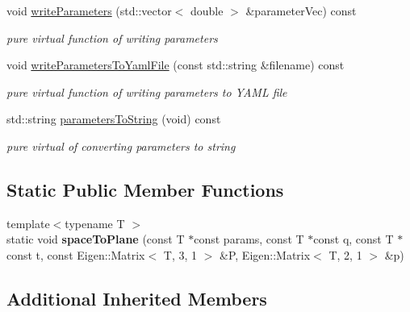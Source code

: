 \begin{DoxyCompactItemize}
void \hyperlink{classcamodocal_1_1PinholeCamera_a87f00320069f054a1dff89e23d65fa0b}{write\+Parameters} (std\+::vector$<$ double $>$ \&parameter\+Vec) const
\begin{DoxyCompactList}\small\item\em pure virtual function of writing parameters \end{DoxyCompactList}\item 
\mbox{\label{classcamodocal_1_1PinholeCamera_a364713cbd54cb444e0e853081c83a3ae}} 
void \hyperlink{classcamodocal_1_1PinholeCamera_a364713cbd54cb444e0e853081c83a3ae}{write\+Parameters\+To\+Yaml\+File} (const std\+::string \&filename) const
\begin{DoxyCompactList}\small\item\em pure virtual function of writing parameters to Y\+A\+ML file \end{DoxyCompactList}\item 
\mbox{\label{classcamodocal_1_1PinholeCamera_ab9381cdc2ec2d4248093d1ddf7d92dad}} 
std\+::string \hyperlink{classcamodocal_1_1PinholeCamera_ab9381cdc2ec2d4248093d1ddf7d92dad}{parameters\+To\+String} (void) const
\begin{DoxyCompactList}\small\item\em pure virtual of converting parameters to string \end{DoxyCompactList}\end{DoxyCompactItemize}
\subsection*{Static Public Member Functions}
\begin{DoxyCompactItemize}
\item 
\mbox{\label{classcamodocal_1_1PinholeCamera_a7b6f96c5b924d7ab0f98bc24410edee3}} 
{\footnotesize template$<$typename T $>$ }\\static void {\bfseries space\+To\+Plane} (const T $\ast$const params, const T $\ast$const q, const T $\ast$const t, const Eigen\+::\+Matrix$<$ T, 3, 1 $>$ \&P, Eigen\+::\+Matrix$<$ T, 2, 1 $>$ \&p)
\end{DoxyCompactItemize}
\subsection*{Additional Inherited Members}



